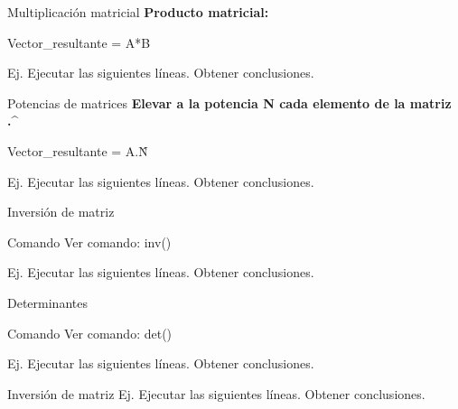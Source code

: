 \documentclass{bredelebeamer}
\begin{document}
\begin{frame}{Multiplicación matricial}
\textbf{Producto matricial:}
\begin{center}
Vector\_resultante = A*B
\end{center}
Ej. Ejecutar las siguientes líneas. Obtener conclusiones.

\end{frame}

\begin{frame}{Potencias de matrices}
\textbf{Elevar a la potencia N cada elemento de la matriz} \textbf{.\^}
\begin{center}
Vector\_resultante = A.\^N
\end{center}
Ej. Ejecutar las siguientes líneas. Obtener conclusiones.

\end{frame}

\begin{frame}{Inversión de matriz}
\begin{exampleblock}{Comando}
Ver comando: inv()
\end{exampleblock}
Ej. Ejecutar las siguientes líneas. Obtener conclusiones.

\end{frame}

\begin{frame}{Determinantes}
\begin{exampleblock}{Comando}
Ver comando: det()
\end{exampleblock}
Ej. Ejecutar las siguientes líneas. Obtener conclusiones.

\end{frame}

\begin{frame}{Inversión de matriz}
Ej. Ejecutar las siguientes líneas. Obtener conclusiones.

\end{frame}
\end{document}
